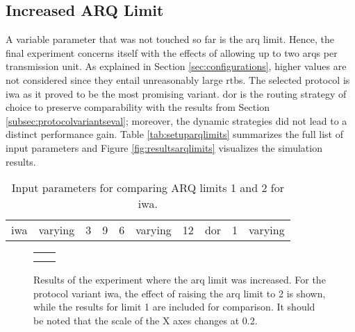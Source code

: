\subsection{Increased ARQ Limit}
A variable parameter that was not touched so far is the \gls{arq} limit. Hence, the final experiment concerns itself with the effects of allowing up
to two \glspl{arq} per transmission unit. As explained in Section \ref{sec:configurations}, higher values are not considered since they entail
unreasonably large \glspl{rtb}. The selected protocol is \gls{iwa} as it proved to be the most promising variant. \Gls{dor} is the routing strategy of
choice to preserve comparability with the results from Section \ref{subsec:protocolvariantseval}; moreover, the dynamic strategies did not lead to a
distinct performance gain. Table \vref{tab:setuparqlimits} summarizes the full list of input parameters and Figure \vref{fig:resultsarqlimits}
visualizes the simulation results.

\begin{table}
    \centering
    \begin{tabulary}{\textwidth}{C|C|C|C|C|C|C|C|C|C}
        \pProtVar{} & \pNCMode{} & \pEncMods{} & \pAuthMods{} & \pRQSize{} & \pARQLimit{} & \pARQTimeout{} & \pRStrat{} & \pAttackerSet{} & \pAttackProb{} \\\hline
        \gls{iwa} & varying & 3 & 9 & 6 & varying & 12 & \gls{dor} & 1 & varying \\
    \end{tabulary}
    \caption[Input parameters for comparing different ARQ limits]{Input parameters for comparing ARQ limits 1 and 2 for \gls{iwa}.}
    \label{tab:setuparqlimits}
\end{table}

\begin{figure}
    \centering
    \begin{tabular}{cc}
         &  \\
         & 
    \end{tabular}
    \caption[Results for the ARQ limit comparison]{Results of the experiment where the \gls{arq} limit was increased. For the protocol
    variant \gls{iwa}, the effect of raising the \gls{arq} limit to 2 is shown, while the results for limit 1 are included for comparison. It should
    be noted that the scale of the X axes changes at 0.2.}
    \label{fig:resultsarqlimits}
\end{figure}


